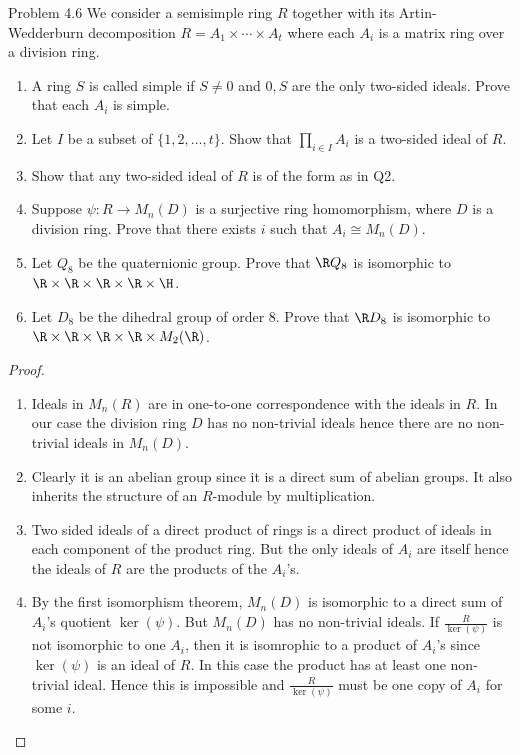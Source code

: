 \documentclass[a4paper]{article}
\begin{document}
\begin{ex}{Problem 4.6}{} We consider a semisimple ring $R$ together with its Artin-Wedderburn decomposition $R=A_1\times\cdots\times A_t$ where each $A_i$ is a matrix ring over a division ring.
\begin{enumerate}
\item A ring $S$ is called simple if $S\neq 0$ and $0,S$ are the only two-sided ideals. Prove that each $A_i$ is simple.
\item Let $I$ be a subset of $\{1,2,\dots,t\}$. Show that $\prod_{i\in I}A_i$ is a two-sided ideal of $R$.
\item Show that any two-sided ideal of $R$ is of the form as in Q2.
\item Suppose $\psi:R\to M_n(D)$ is a surjective ring homomorphism, where $D$ is a division
ring. Prove that there exists $i$ such that $A_i\cong M_n(D)$.
\item Let $Q_8$ be the quaternionic group. Prove that $\R Q_8$ is isomorphic to $\R\times\R\times\R\times\R\times\H$. 
\item Let $D_8$ be the dihedral group of order $8$. Prove that $\R D_8$ is isomorphic to $\R\times\R\times\R\times\R\times M_2(\R)$. 
\end{enumerate} 
\begin{proof}~\\
\begin{enumerate}
\item Ideals in $M_n(R)$ are in one-to-one correspondence with the ideals in $R$. In our case the division ring $D$ has no non-trivial ideals hence there are no non-trivial ideals in $M_n(D)$. 
\item Clearly it is an abelian group since it is a direct sum of abelian groups. It also inherits the structure of an $R$-module by multiplication. 
\item Two sided ideals of a direct product of rings is a direct product of ideals in each component of the product ring. But the only ideals of $A_i$ are itself hence the ideals of $R$ are the products of the $A_i$'s. 
\item By the first isomorphism theorem, $M_n(D)$ is isomorphic to a direct sum of $A_i$'s quotient $\ker(\psi)$. But $M_n(D)$ has no non-trivial ideals. If $\frac{R}{\ker(\psi)}$ is not isomorphic to one $A_i$, then it is isomrophic to a product of $A_i$'s since $\ker(\psi)$ is an ideal of $R$. In this case the product has at least one non-trivial ideal. Hence this is impossible and $\frac{R}{\ker(\psi)}$ must be one copy of $A_i$ for some $i$. 

\end{enumerate}
\end{proof}
\end{ex}
\end{document}
